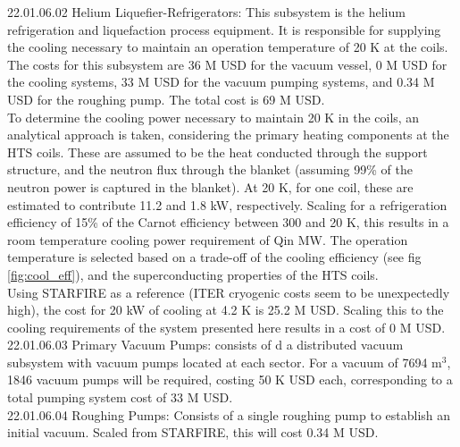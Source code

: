 \begin{table}[h]
    \centering
    \caption{Vacuum vessel parameters.}
    \label{tab:ves_params}
\end{table}






22.01.06.02 Helium Liquefier-Refrigerators: This subsystem is the helium refrigeration and liquefaction process equipment. It is responsible for supplying the cooling necessary to maintain an operation temperature of 20 K at the coils. \\

The costs for this subsystem are 36 M USD for the vacuum vessel, 0 M USD for the cooling systems, 33 M USD for the vacuum pumping systems, and 0.34 M USD for the roughing pump. The total cost is 69 M USD.\\

To determine the cooling power necessary to maintain 20 K in the coils, an analytical approach is taken, considering the primary heating components at the HTS coils. These are assumed to be the heat conducted through the support structure, and the neutron flux through the blanket (assuming 99\% of the neutron power is captured in the blanket). At 20 K, for one coil, these are estimated to contribute 11.2 and 1.8 kW, respectively. Scaling for a refrigeration efficiency of 15\% of the Carnot efficiency between 300 and 20 K, this results in a room temperature cooling power requirement of Qin MW. The operation temperature is selected based on a trade-off of the cooling efficiency (see fig \ref{fig:cool_eff}), and the superconducting properties of the HTS coils.\\

Using STARFIRE as a reference (ITER cryogenic costs seem to be unexpectedly high), the cost for 20 kW of cooling at 4.2 K is 25.2 M USD. Scaling this to the cooling requirements of the system presented here results in a cost of 0 M USD. \\



22.01.06.03 Primary Vacuum Pumps: consists of d a distributed vacuum subsystem with vacuum pumps located at each sector. For a vacuum of 7694 m$^3$, 1846 vacuum pumps will be required, costing 50 K USD each, corresponding to a total pumping system cost of 33 M USD.\\

22.01.06.04 Roughing Pumps: Consists of a single roughing pump to establish an initial vacuum. Scaled from STARFIRE, this will cost 0.34 M USD.


